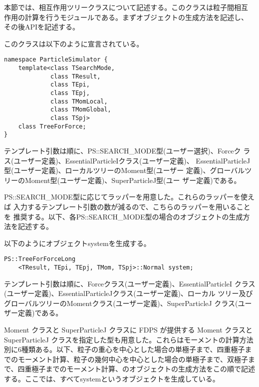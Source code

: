 本節では、相互作用ツリークラスについて記述する。このクラスは粒子間相互
作用の計算を行うモジュールである。まずオブジェクトの生成方法を記述し、
その後APIを記述する。


このクラスは以下のように宣言されている。
\begin{lstlisting}[caption=TreeForForce0]
namespace ParticleSimulator {
    template<class TSearchMode,
             class TResult,
             class TEpi,
             class TEpj,
             class TMomLocal,
             class TMomGlobal,
             class TSpj>
    class TreeForForce;
}
\end{lstlisting}

テンプレート引数は順に、PS::SEARCH\_MODE型(ユーザー選択)、Forceク
ラス(ユーザー定義)、EssentialParticleIクラス(ユーザー定義)、
EssentialParticleJ型(ユーザー定義)、ローカルツリーのMoment型(ユーザー
定義)、グローバルツリーのMoment型(ユーザー定義)、SuperParticleJ型(ユー
ザー定義)である。

PS::SEARCH\_MODE型に応じてラッパーを用意した。これらのラッパーを使えば
入力するテンプレート引数の数が減るので、こちらのラッパーを用いることを
推奨する。以下、各PS::SEARCH\_MODE型の場合のオブジェクトの生成方法を記述する。

\label{sec:module_treeforce_standard_search_mode_long}

以下のようにオブジェクトsystemを生成する。
\begin{screen}
\begin{verbatim}
PS::TreeForForceLong
    <TResult, TEpi, TEpj, TMom, TSpj>::Normal system;
\end{verbatim}
\end{screen}
テンプレート引数は順に、Forceクラス(ユーザー定義)、EssentialParticleI
クラス(ユーザー定義)、EssentialParticleJクラス(ユーザー定義)、ローカル
ツリー及びグローバルツリーのMomentクラス(ユーザー定義)、SuperParticleJ
クラス(ユーザー定義)である。

Moment クラスと SuperParticleJ クラスに FDPS が提供する Moment クラスと SuperParticleJ クラスを指定した型も用意した。これらはモーメントの計算方法別に6種類ある。以下、粒子の重心を中心とした場合の単極子まで、四重極子までのモーメント計算、粒子の幾何中心を中心とした場合の単極子まで、双極子まで、四重極子までのモーメント計算、のオブジェクトの生成方法をこの順で記述する。ここでは、すべてsystemというオブジェクトを生成している。

